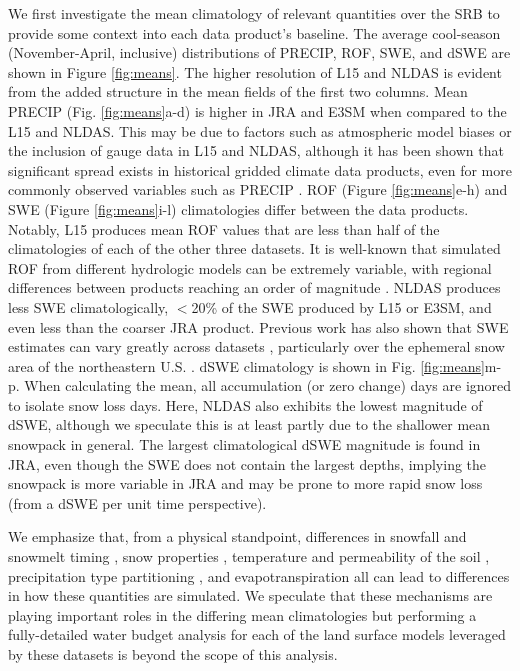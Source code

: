 \documentclass[nhess, manuscript]{copernicus}
\begin{document}
We first investigate the mean climatology of relevant quantities over the SRB to provide some context into each data product's baseline.
The average cool-season (November-April, inclusive) distributions of PRECIP, ROF, SWE, and dSWE are shown in Figure \ref{fig:means}.
The higher resolution of L15 and NLDAS is evident from the added structure in the mean fields of the first two columns.
Mean PRECIP (Fig. \ref{fig:means}a-d) is higher in JRA and E3SM when compared to the L15 and NLDAS.
This may be due to factors such as atmospheric model biases or the inclusion of gauge data in L15 and NLDAS, although it has been shown that significant spread exists in historical gridded climate data products, even for more commonly observed variables such as PRECIP \citep{gutmann2012comparison,livneh2014filling,henn2018an}.
ROF (Figure \ref{fig:means}e-h) and SWE (Figure \ref{fig:means}i-l) climatologies differ between the data products.
Notably, L15 produces mean ROF values that are less than half of the climatologies of each of the other three datasets.
It is well-known that simulated ROF from different hydrologic models can be extremely variable, with regional differences between products reaching an order of magnitude \citep{gudmundsson2012comparing,sood2015global,beck2017global}.
NLDAS produces less SWE climatologically, $<$20\% of the SWE produced by L15 or E3SM, and even less than the coarser JRA product.
Previous work has also shown that SWE estimates can vary greatly across datasets \citep{lundquist2015high,Rhoades2018a}, particularly over the ephemeral snow area of the northeastern U.S. \citep{mccrary2017evaluation,mccrary2022projections}.
dSWE climatology is shown in Fig. \ref{fig:means}m-p.
When calculating the mean, all accumulation (or zero change) days are ignored to isolate snow loss days.
Here, NLDAS also exhibits the lowest magnitude of dSWE, although we speculate this is at least partly due to the shallower mean snowpack in general.
The largest climatological dSWE magnitude is found in JRA, even though the SWE does not contain the largest depths, implying the snowpack is more variable in JRA and may be prone to more rapid snow loss (from a dSWE per unit time perspective).

We emphasize that, from a physical standpoint, differences in snowfall and snowmelt timing \citep{rauscher2008future,mccabe2005trends}, snow properties \citep{brown2006evaluation}, temperature and permeability of the soil \citep{niu2006effects}, precipitation type partitioning \citep{knowles2006trends}, and evapotranspiration \citep{zheng2019on} all can lead to differences in how these quantities are simulated.
We speculate that these mechanisms are playing important roles in the differing mean climatologies but performing a fully-detailed water budget analysis for each of the land surface models leveraged by these datasets is beyond the scope of this analysis.
\end{document}

